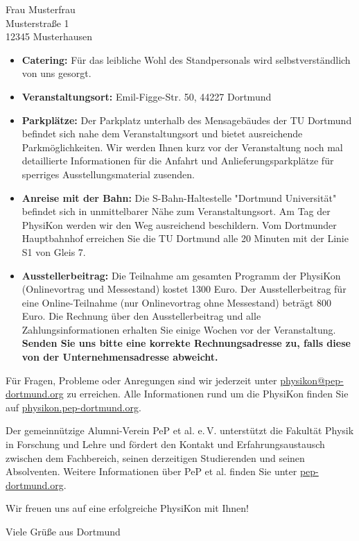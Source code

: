 \documentclass[
  pepbrief,
  fontsize=12pt,
  paper=a4,
  DIV=14,
  parskip=half,
  backaddress=false,
]{scrlttr2}
\begin{document}
\begin{letter}{%
  Frau Musterfrau \\
  Musterstraße 1 \\
  12345 Musterhausen
}
\begin{itemize}
    Sie offene Stellen, Praktika oder Traineeprogramme veröffentlichen. Damit die Anzeigen möglichst 
    aktuell sind, werden wir Sie einige Wochen vor der Veranstaltung bitten, uns Stellenangebote zuzusenden. 
    Sie können die Jobbörse aber auch gerne schon vorab nutzen, wenn sie aktuelle Stellenausschreibungen haben.
    Unsere Jobbörse ist unabhängig von der PhysiKon immer online.
    \item \textbf{Catering:} Für das leibliche Wohl des Standpersonals wird selbstverständlich von uns gesorgt.
    \item \textbf{Veranstaltungsort:} Emil-Figge-Str. 50, 44227 Dortmund
    \item \textbf{Parkplätze:} Der Parkplatz unterhalb des Mensagebäudes der TU Dortmund befindet sich nahe dem Veranstaltungsort und bietet  
    ausreichende Parkmöglichkeiten. Wir werden Ihnen kurz vor der Veranstaltung noch mal detaillierte Informationen für die Anfahrt und Anlieferungsparkplätze für sperriges Ausstellungsmaterial zusenden. 
    \item \textbf{Anreise mit der Bahn:} Die S-Bahn-Haltestelle "Dortmund Universität" befindet sich in unmittelbarer Nähe zum Veranstaltungsort.
    Am Tag der PhysiKon werden wir den Weg ausreichend beschildern.
    Vom Dortmunder Hauptbahnhof erreichen Sie die TU Dortmund alle 20 Minuten mit der Linie S1 von Gleis 7.
    \item \textbf{Ausstellerbeitrag:} Die Teilnahme am gesamten Programm der PhysiKon (Onlinevortrag und Messestand) kostet 1300 Euro.
    Der Ausstellerbeitrag für eine Online-Teilnahme (nur Onlinevortrag ohne Messestand) beträgt 800 Euro.
    Die Rechnung über den Ausstellerbeitrag und alle Zahlungsinformationen erhalten Sie einige Wochen vor der Veranstaltung.
    \textbf{Senden Sie uns bitte eine korrekte Rechnungsadresse zu, falls diese von der Unternehmensadresse abweicht.}
\end{itemize}

Für Fragen, Probleme oder Anregungen sind wir jederzeit unter \href{mailto:physikon@pep-dortmund.org}{physikon@pep-dortmund.org} zu erreichen. 
Alle Informationen rund um die PhysiKon finden Sie auf \href{https://physikon.pep-dortmund.org/}{physikon.pep-dortmund.org}.

Der gemeinnützige Alumni-Verein PeP et al. e.\,V. unterstützt die Fakultät Physik in Forschung und Lehre und fördert den Kontakt und Erfahrungsaustausch zwischen dem Fachbereich,
seinen derzeitigen Studierenden und seinen Absolventen.
Weitere Informationen über PeP et al. finden Sie unter
\href{https://pep-dortmund.org/}{pep-dortmund.org}.

Wir freuen uns auf eine erfolgreiche PhysiKon mit Ihnen!

\closing{Viele Grüße aus Dortmund}

\end{letter}
\end{document}
